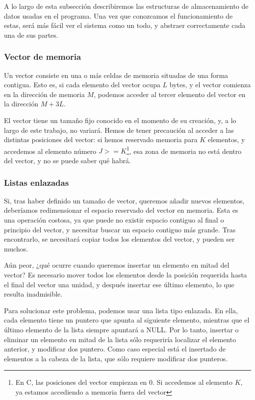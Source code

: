 A lo largo de esta subsección describiremos las estructuras de almacenamiento de datos usadas en el programa. Una vez 
que conozcamos el funcionamiento de estas, será más fácil ver el sistema como un todo, y abstraer correctamente cada 
una de sus partes.

\subsubsection{Vector de memoria}
Un vector consiste en una o más celdas de memoria situadas de una forma contigua. Esto es, si cada elemento del vector 
ocupa $L$ bytes, y el vector comienza en la dirección de memoria $M$, podemos acceder al tercer elemento del vector en 
la dirección $M+3L$.

El vector tiene un tamaño fijo conocido en el momento de su creación, y, a lo largo de este trabajo, no variará. Hemos 
de tener precaución al acceder a las distintas posiciones del vector: si hemos reservado memoria para $K$ elementos, y 
accedemos al elemento número $J>=K$\footnote{En C, las posiciones del vector empiezan en 0. Si accedemos al elemento 
$K$, ya estamos accediendo a memoria fuera del vector}, esa zona de memoria no está dentro del vector, y no se puede 
saber qué habrá.

\subsubsection{Listas enlazadas}
Si, tras haber definido un tamaño de vector, queremos añadir nuevos elementos, deberíamos redimensionar el espacio 
reservado del vector en memoria. Esta es una operación costosa, ya que puede no existir espacio contiguo al final o 
principio del vector, y necesitar buscar un espacio contiguo más grande. Tras encontrarlo, se necesitará copiar todos 
los elementos del vector, y pueden ser muchos.

Aún peor, ¿qué ocurre cuando queremos insertar un elemento en mitad del vector? Es necesario mover todos los elementos 
desde la posición requerida hasta el final del vector una unidad, y después insertar ese último elemento, lo que 
resulta inadmisible.

Para solucionar este problema, podemos usar una lista tipo enlazada. En ella, cada elemento tiene un puntero que apunta 
al siguiente elemento, mientras que el último elemento de la lista siempre apuntará a NULL. Por lo tanto, insertar o 
eliminar un elemento en mitad de la lista sólo requeriría localizar el elemento anterior, y modificar dos puntero. Como 
caso especial está el insertado de elementos a la cabeza de la lista, que sólo requiere modificar dos punteros.


